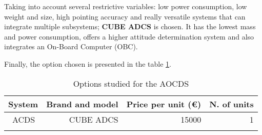 Taking into account several restrictive variables: low power consumption, low weight and size, high pointing accuracy and really versatile systems that can integrate multiple subsystems; \textbf{CUBE ADCS} is chosen. It has the lowest mass and power consumption, offers a higher attitude determination system and also integrates an On-Board Computer (OBC). \cite[Chapter 1, Section 4]{annex4}

Finally, the option chosen is presented in the table \ref{tab:eps_final}.

\begin{longtable}{| l | r | r | r | }
\hline
\rowcolor[gray]{0.80}	\textbf{System} &  \textbf{Brand and model}     & \textbf{Price per unit (\euro)}  & \textbf{N. of units}  \\
\hline
\endfirsthead

	   ~ACDS & CUBE ADCS & 15000 & 1\\
	\hline

\caption{Options studied for the AOCDS}
\label{tab:eps_final}
\end{longtable}